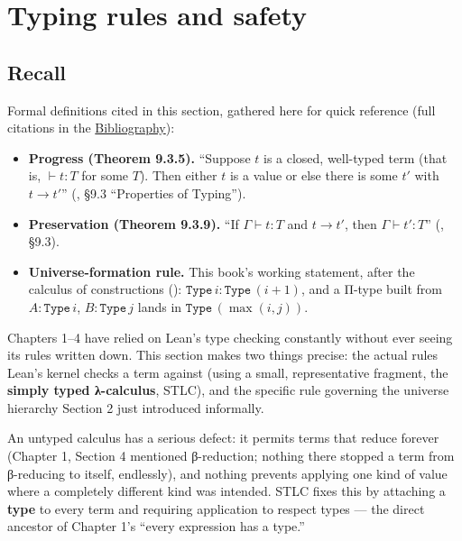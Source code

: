 \section{Typing rules and safety}\label{sec:05-rigor-check:03-typing-rules-and-safety:1}

\subsection{Recall}\label{sec:05-rigor-check:03-typing-rules-and-safety:2}

Formal definitions cited in this section, gathered here for quick reference (full citations in the \hyperref[sec:root:bibliography:1]{Bibliography}):

\begin{itemize}
\tightlist
\item
  \textbf{Progress (Theorem 9.3.5).} ``Suppose \(t\) is a closed, well-typed term (that is, \(\vdash t : T\) for some \(T\)). Then either \(t\) is a value or else there is some \(t'\) with \(t \to t'\)'' (\cite{Pierce2002}, §9.3 ``Properties of Typing'').
\item
  \textbf{Preservation (Theorem 9.3.9).} ``If \(\Gamma \vdash t : T\) and \(t \to t'\), then \(\Gamma \vdash t' : T\)'' (\cite{Pierce2002}, §9.3).
\item
  \textbf{Universe-formation rule.} This book's working statement, after the calculus of constructions (\cite{CoquandHuet1988}): \(\mathtt{Type}\,i : \mathtt{Type}\,(i+1)\), and a Π-type built from \(A : \mathtt{Type}\,i\), \(B : \mathtt{Type}\,j\) lands in \(\mathtt{Type}\,(\max(i,j))\).
\end{itemize}

Chapters 1--4 have relied on Lean's type checking constantly without ever seeing its rules written down. This section makes two things precise: the actual rules Lean's kernel checks a term against (using a small, representative fragment, the \textbf{simply typed λ-calculus}, STLC), and the specific rule governing the universe hierarchy Section 2 just introduced informally.

An untyped calculus has a serious defect: it permits terms that reduce forever (Chapter 1, Section 4 mentioned β-reduction; nothing there stopped a term from β-reducing to itself, endlessly), and nothing prevents applying one kind of value where a completely different kind was intended. STLC fixes this by attaching a \textbf{type} to every term and requiring application to respect types --- the direct ancestor of Chapter 1's ``every expression has a type.''

